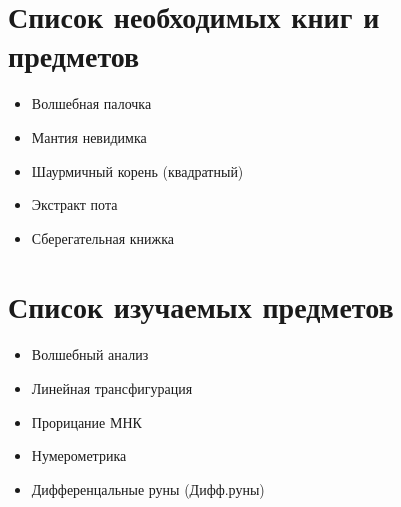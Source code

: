 \documentclass[14pt,a4paper, oneside]{report}
\begin{document}
\section{Список необходимых книг и предметов}

\begin{itemize}
\item Волшебная палочка
\item Мантия невидимка
\item Шаурмичный корень (квадратный)
\item Экстракт пота
\item Сберегательная книжка
\end{itemize}
\newpage
\section{Список изучаемых предметов}

\begin{itemize}
\item Волшебный анализ
\item Линейная трансфигурация
\item Прорицание МНК
\item Нумерометрика
\item Дифференцальные руны (Дифф.руны)
\end{itemize}
\end{document}
